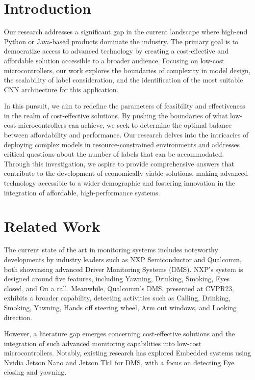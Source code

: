 \documentclass[journal,article,submit,pdftex,moreauthors]{Definitions/mdpi}
\begin{document}

\section{Introduction}

Our research addresses a significant gap in the current landscape where high-end Python or Java-based products dominate the industry. The primary goal is to democratize access to advanced technology by creating a cost-effective and affordable solution accessible to a broader audience. Focusing on low-cost microcontrollers, our work explores the boundaries of complexity in model design, the scalability of label consideration, and the identification of the most suitable CNN architecture for this application.

In this pursuit, we aim to redefine the parameters of feasibility and effectiveness in the realm of cost-effective solutions. By pushing the boundaries of what low-cost microcontrollers can achieve, we seek to determine the optimal balance between affordability and performance. Our research delves into the intricacies of deploying complex models in resource-constrained environments and addresses critical questions about the number of labels that can be accommodated. Through this investigation, we aspire to provide comprehensive answers that contribute to the development of economically viable solutions, making advanced technology accessible to a wider demographic and fostering innovation in the integration of affordable, high-performance systems.
\section{Related Work}

The current state of the art in monitoring systems includes noteworthy developments by industry leaders such as NXP Semiconductor and Qualcomm, both showcasing advanced Driver Monitoring Systems (DMS). NXP's system is designed around five features, including Yawning, Drinking, Smoking, Eyes closed, and On a call. Meanwhile, Qualcomm's DMS, presented at CVPR23, exhibits a broader capability, detecting activities such as Calling, Drinking, Smoking, Yawning, Hands off steering wheel, Arm out windows, and Looking direction.

However, a literature gap emerges concerning cost-effective solutions and the integration of such advanced monitoring capabilities into low-cost microcontrollers. Notably, existing research has explored Embedded systems using Nvidia Jetson Nano and Jetson Tk1 for DMS, with a focus on detecting Eye closing and yawning.
\end{document}

